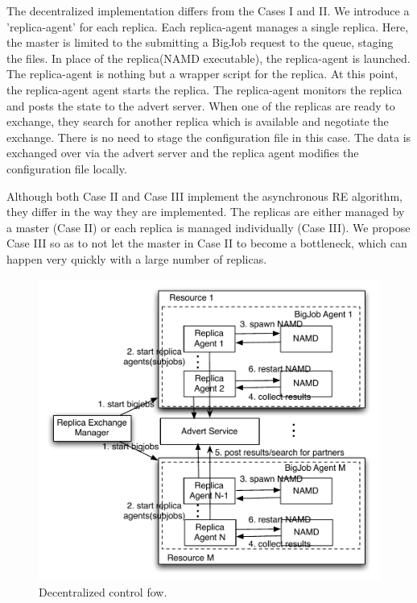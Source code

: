 \documentclass[a4paper,10pt]{article}
\begin{document}
The decentralized implementation differs from the Cases I and II. We introduce a 'replica-agent' for each replica. Each replica-agent manages a single replica. Here, the master is limited to the submitting a BigJob request to the queue, staging the files. In place of the replica(NAMD executable), the replica-agent is launched. The replica-agent is nothing but a wrapper script for the replica. At this point, the replica-agent agent starts the replica. The replica-agent monitors the replica and posts the state to the advert server. When one of the replicas are ready to exchange, they search for another replica which is available and negotiate the exchange. There is no need to stage the configuration file in this case. The data is exchanged over via the advert server and the replica agent modifies the configuration file locally.

Although both Case II and Case III implement the asynchronous RE algorithm, they differ in the way they are implemented. The replicas are either managed by a master (Case II) or each replica is managed individually (Case III). We propose Case III so as to not let the master in Case II to become a bottleneck, which can happen very quickly with a large number of replicas.

\begin{figure}
\centering
\includegraphics[width=1\textwidth]{figures/asyncre.pdf}
\caption{\small Decentralized control fow.}
\label{fig:decent}
\end{figure}
\end{document}
